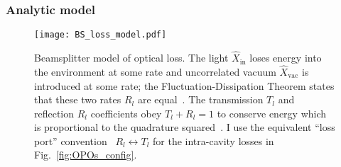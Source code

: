 
\subsubsection{Analytic model}
\label{sec:dOPO_model}

\begin{figure}
	\centering
	\texttt{[image: BS\_loss\_model.pdf]}
	\caption{Beamsplitter model of optical loss. The light $\hat X_\text{in}$ loses energy into the environment at some rate and uncorrelated vacuum $\hat X_\text{vac}$ is introduced at some rate; the Fluctuation-Dissipation Theorem states that these two rates $R_l$ are equal~\cite{}. The transmission $T_l$ and reflection $R_l$ coefficients obey $T_l+R_l=1$ to conserve energy which is proportional to the quadrature squared~\cite{}. I use the equivalent ``loss port'' convention~\cite{} $R_l\leftrightarrow T_l$ for the intra-cavity losses in Fig.~\ref{fig:OPOs_config}.}
	\label{fig:beamsplitter_loss}
\end{figure}


